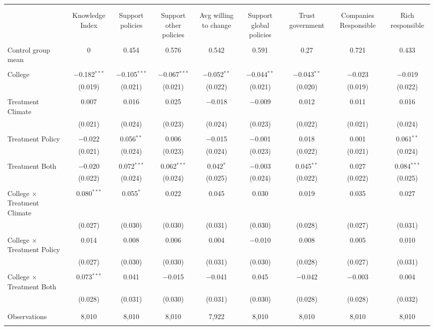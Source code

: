 
\begin{tabular}{@{\extracolsep{5pt}}lcccccccc} 
\\[-1.8ex]\hline 
\hline \\[-1.8ex] 
\\[-1.8ex] & Knowledge Index & Support policies & Support other policies & Avg willing to change & Support global policies & Trust government & Companies Responsible & Rich responsible \\ 
\hline \\[-1.8ex] 
 Control group mean & 0 & 0.454 & 0.576 & 0.542 & 0.591 & 0.27 & 0.721 & 0.433  \\ \hline \\[-1.8ex] College & $-$0.182$^{***}$ & $-$0.105$^{***}$ & $-$0.067$^{***}$ & $-$0.052$^{**}$ & $-$0.044$^{**}$ & $-$0.043$^{**}$ & $-$0.023 & $-$0.019 \\ 
  & (0.019) & (0.021) & (0.021) & (0.022) & (0.021) & (0.020) & (0.019) & (0.022) \\ 
  & & & & & & & & \\ 
 Treatment Climate & 0.007 & 0.016 & 0.025 & $-$0.018 & $-$0.009 & 0.012 & 0.011 & 0.016 \\ 
  & (0.021) & (0.024) & (0.023) & (0.024) & (0.023) & (0.022) & (0.021) & (0.024) \\ 
  & & & & & & & & \\ 
 Treatment Policy & $-$0.022 & 0.056$^{**}$ & 0.006 & $-$0.015 & $-$0.001 & 0.018 & 0.001 & 0.061$^{**}$ \\ 
  & (0.021) & (0.024) & (0.023) & (0.024) & (0.023) & (0.022) & (0.021) & (0.024) \\ 
  & & & & & & & & \\ 
 Treatment Both & $-$0.020 & 0.072$^{***}$ & 0.062$^{***}$ & 0.042$^{*}$ & $-$0.003 & 0.045$^{**}$ & 0.027 & 0.084$^{***}$ \\ 
  & (0.022) & (0.024) & (0.024) & (0.025) & (0.024) & (0.022) & (0.022) & (0.025) \\ 
  & & & & & & & & \\ 
 College $\times$ Treatment Climate & 0.080$^{***}$ & 0.055$^{*}$ & 0.022 & 0.045 & 0.030 & 0.019 & 0.035 & 0.027 \\ 
  & (0.027) & (0.030) & (0.030) & (0.031) & (0.030) & (0.028) & (0.027) & (0.031) \\ 
  & & & & & & & & \\ 
 College $\times$ Treatment Policy & 0.014 & 0.008 & 0.006 & 0.004 & $-$0.010 & 0.008 & 0.005 & 0.010 \\ 
  & (0.027) & (0.030) & (0.030) & (0.031) & (0.030) & (0.028) & (0.027) & (0.031) \\ 
  & & & & & & & & \\ 
 College $\times$ Treatment Both & 0.073$^{***}$ & 0.041 & $-$0.015 & $-$0.041 & 0.045 & $-$0.042 & $-$0.003 & 0.004 \\ 
  & (0.028) & (0.031) & (0.030) & (0.031) & (0.030) & (0.028) & (0.028) & (0.032) \\ 
  & & & & & & & & \\ 
\hline \\[-1.8ex] 

Observations & 8,010 & 8,010 & 8,010 & 7,922 & 8,010 & 8,010 & 8,010 & 8,010 \\ 
\hline 
\hline \\[-1.8ex] 
\end{tabular} 